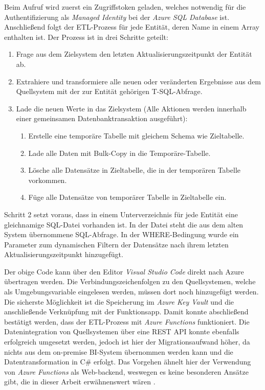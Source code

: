 Beim Aufruf wird zuerst ein Zugriffstoken geladen, welches notwendig für die Authentifizierung als \textit{Managed Identity} bei der \textit{Azure SQL Database} ist. Anschließend folgt der ETL-Prozess für jede Entität, deren Name in einem Array enthalten ist. Der Prozess ist in drei Schritte geteilt:
\begin{enumerate}
\item Frage aus dem Zielsystem den letzten Aktualisierungszeitpunkt der Entität ab.
\item Extrahiere und transformiere alle neuen oder veränderten Ergebnisse aus dem Quellsystem mit der zur Entität gehörigen T-SQL-Abfrage.
\item Lade die neuen Werte in das Zielsystem (Alle Aktionen werden innerhalb einer gemeinsamen Datenbanktransaktion ausgeführt):
    \begin{enumerate}
    \item Erstelle eine temporäre Tabelle mit gleichem Schema wie Zieltabelle.
    \item Lade alle Daten mit Bulk-Copy in die Temporäre-Tabelle.
    \item Lösche alle Datensätze in Zieltabelle, die in der temporären Tabelle vorkommen.
    \item Füge alle Datensätze von temporärer Tabelle in Zieltabelle ein.
    \end{enumerate}
\end{enumerate}
Schritt 2 setzt voraus, dass in einem Unterverzeichnis für jede Entität eine gleichnamige SQL-Datei vorhanden ist. In der Datei steht die aus dem alten System übernommene SQL-Abfrage. In der WHERE-Bedingung wurde ein Parameter zum dynamischen Filtern der Datensätze nach ihrem letzten Aktualisierungszeitpunkt hinzugefügt.



Der obige Code kann über den Editor \textit{Visual Studio Code} direkt nach Azure übertragen werden. Die Verbindungszeichenfolgen zu den Quellsystemen, welche als Umgebungsvariable eingelesen werden, müssen dort noch hinzugefügt werden. Die sicherste Möglichkeit ist die Speicherung im \textit{Azure Key Vault} und die anschließende Verknüpfung mit der  Funktionsapp. Damit konnte abschließend bestätigt werden, dass der ETL-Prozess mit \textit{Azure Functions} funktioniert. Die Datenintegration von Quellsystemen über eine REST API konnte ebenfalls erfolgreich umgesetzt werden, jedoch ist hier der Migrationsaufwand höher, da nichts aus dem on-premise BI-System übernommen werden kann und die Datentransformation in C\# erfolgt. Das Vorgehen ähnelt hier der Verwendung von \textit{Azure Functions} als Web-backend, weswegen es keine besonderen Ansätze gibt, die in dieser Arbeit erwähnenswert wären \cite[vgl.][]{kurniawan_practical_2019, satapathi_hands-azure_2021}.

